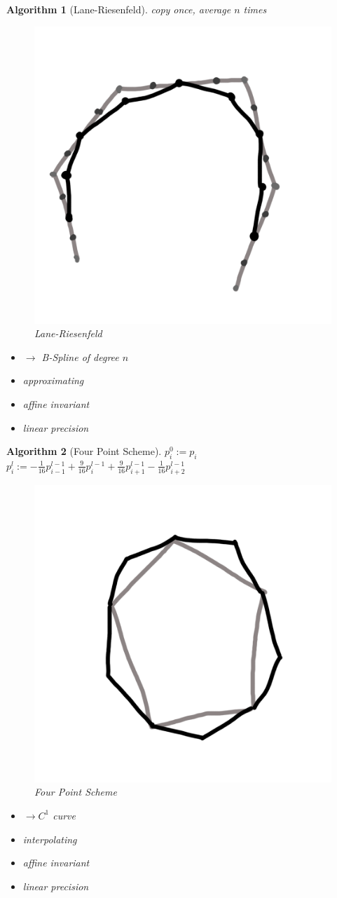 \documentclass[conference]{IEEEtran}
\newtheorem{algorithm}{Algorithm}
\begin{document}
\begin{algorithm}[Lane-Riesenfeld]
	copy once, average $n$ times
	
	\begin{figure}[h!]
		\centering
		\includegraphics[width=0.5\linewidth]{figures/lane_riesenfeld_short}
		\caption{Lane-Riesenfeld}
	\end{figure}
	
	\begin{itemize}
		\item $\rightarrow$ B-Spline of degree $n$
		\item approximating
		\item affine invariant
		\item linear precision
	\end{itemize}
\end{algorithm}

\begin{algorithm}[Four Point Scheme]
	$p_i^0 := p_i$\\
	$p_i^l := -\frac{1}{16} p_{i-1}^{l-1} + \frac{9}{16} p_i^{l-1} + \frac{9}{16} p_{i+1}^{l-1} - \frac{1}{16} p_{i+2}^{l-1}$
	
	\begin{figure}[h!]
		\centering
		\includegraphics[width=0.5\linewidth]{figures/four_point_short}
		\caption{Four Point Scheme}
	\end{figure}
	
	\begin{itemize}
		\item $\rightarrow C^1$ curve
		\item interpolating
		\item affine invariant
		\item linear precision
	\end{itemize}
\end{algorithm}
\end{document}
